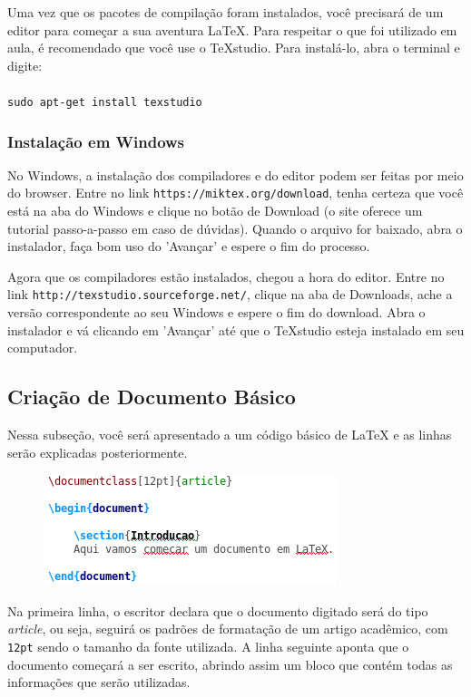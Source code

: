 \documentclass[12pt]{article}
\begin{document}
				Uma vez que os pacotes de compilação foram instalados, você precisará de um editor para começar a sua aventura LaTeX. Para respeitar o que foi utilizado em aula, é recomendado que você use o TeXstudio. Para instalá-lo, abra o terminal e digite:\\\\
				\texttt{sudo apt-get install texstudio}
			
			\subsubsection{Instalação em Windows}
				No Windows, a instalação dos compiladores e do editor podem ser feitas por meio do browser. Entre no link \texttt{https://miktex.org/download}, tenha certeza que você está na aba do Windows e clique no botão de Download (o site oferece um tutorial passo-a-passo em caso de dúvidas). Quando o arquivo for baixado, abra o instalador, faça bom uso do 'Avançar' e espere o fim do processo.
			
				Agora que os compiladores estão instalados, chegou a hora do editor. Entre no link \texttt{http://texstudio.sourceforge.net/}, clique na aba de Downloads, ache a versão correspondente ao seu Windows e espere o fim do download. Abra o instalador e vá clicando em 'Avançar' até que o TeXstudio esteja instalado em seu computador.
			
		\subsection{Criação de Documento Básico}
			Nessa subseção, você será apresentado a um código básico de LaTeX e as linhas serão explicadas posteriormente.
			
			\begin{figure}[h]
				\begin{center}
					\includegraphics{codigo1.png}
				\end{center}
			\end{figure}
		
			Na primeira linha, o escritor declara que o documento digitado será do tipo \textit{article}, ou seja, seguirá os padrões de formatação de um artigo acadêmico, com \texttt{12pt} sendo o tamanho da fonte utilizada.
			A linha seguinte aponta que o documento começará a ser escrito, abrindo assim um bloco que contém todas as informações que serão utilizadas.
		    
\end{document}
